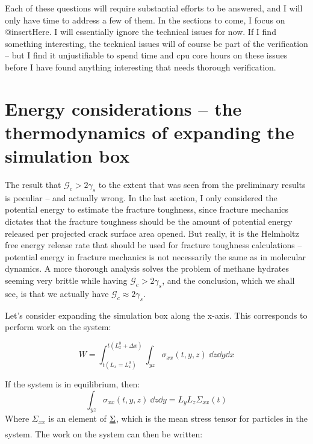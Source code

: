 Each of these questions will require substantial efforts to be answered, and I will only have time to address a few of them. In the sections to come, I focus on @insertHere. I will essentially ignore the technical issues for now. If I find something interesting, the tecknical issues will of course be part of the verification -- but I find it unjustifiable to spend time and cpu core hours on these issues before I have found anything interesting that needs thorough verification.

\section{Energy considerations -- the thermodynamics of expanding the simulation box}
The result that $\mathcal{G}_c > 2\gamma_s$ to the extent that was seen from the preliminary results is peculiar -- and actually wrong. In the last section, I only considered the potential energy to estimate the fracture toughness, since fracture mechanics dictates that the fracture toughness should be the amount of potential energy released per projected crack surface area opened. But really, it is the Helmholtz free energy release rate that should be used for fracture toughness calculations -- potential energy in fracture mechanics is not necessarily the same as in molecular dynamics. A more thorough analysis solves the problem of methane hydrates seeming very brittle while having $\mathcal{G}_c > 2\gamma_s$, and the conclusion, which we shall see, is that we actually have $\mathcal{G}_c \approx 2\gamma_s$.

Let's consider expanding the simulation box along the x-axis. This corresponds to perform work on the system:

\begin{equation}
	W = \int_{t(L_x = L_x^0)}^{t(L_x^0 + \Delta x)} \int_{yz} \sigma_{xx} (t, y, z) \ \dd z \dd y \dd x
\end{equation}

If the system is in equilibrium, then:
\begin{equation}
\int_{yz} \sigma_{xx} (t, y, z) \ \dd z \dd y = L_yL_z\Sigma_{xx}(t)	
\end{equation}
Where $\Sigma_{xx}$ is an element of $\uuline \Sigma$, which is the mean stress tensor for particles in the system. The work on the system can then be written:

